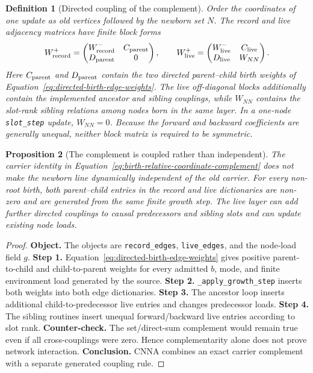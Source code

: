 \documentclass[11pt]{article}
\newtheorem{definition}{Definition}[section]
\newtheorem{proposition}[definition]{Proposition}
\theoremstyle{remark}
\newcommand{\code}[1]{\texttt{#1}}
\numberwithin{equation}{section}
\begin{document}
\begin{definition}[Directed coupling of the complement]
Order the coordinates of one update as old vertices followed by the newborn set $N$. The record and live adjacency matrices have finite block forms
\begin{equation}
  W_{\rm record}^{+}
  =
  \begin{pmatrix}
    W_{\rm record}^{-} & C_{\rm parent}\\
    D_{\rm parent} & 0
  \end{pmatrix},
  \qquad
  W_{\rm live}^{+}
  =
  \begin{pmatrix}
    W_{\rm live}^{-} & C_{\rm live}\\
    D_{\rm live} & W_{NN}
  \end{pmatrix}.
  \label{eq:complement-coupling-blocks}
\end{equation}
Here $C_{\rm parent}$ and $D_{\rm parent}$ contain the two directed parent--child birth weights of Equation~\eqref{eq:directed-birth-edge-weights}. The live off-diagonal blocks additionally contain the implemented ancestor and sibling couplings, while $W_{NN}$ contains the slot-rank sibling relations among nodes born in the same layer. In a one-node \code{slot\_step} update, $W_{NN}=0$. Because the forward and backward coefficients are generally unequal, neither block matrix is required to be symmetric.
\end{definition}

\begin{proposition}[The complement is coupled rather than independent]
The carrier identity in Equation~\eqref{eq:birth-relative-coordinate-complement} does not make the newborn line dynamically independent of the old carrier. For every non-root birth, both parent--child entries in the record and live dictionaries are non-zero and are generated from the same finite growth step. The live layer can add further directed couplings to causal predecessors and sibling slots and can update existing node loads.
\end{proposition}
\begin{proof}
\textbf{Object.} The objects are \code{record\_edges}, \code{live\_edges}, and the node-load field $g$. \textbf{Step 1.} Equation~\eqref{eq:directed-birth-edge-weights} gives positive parent-to-child and child-to-parent weights for every admitted $b$, mode, and finite environment load generated by the source. \textbf{Step 2.} \code{\_apply\_growth\_step} inserts both weights into both edge dictionaries. \textbf{Step 3.} The ancestor loop inserts additional child-to-predecessor live entries and changes predecessor loads. \textbf{Step 4.} The sibling routines insert unequal forward/backward live entries according to slot rank. \textbf{Counter-check.} The set/direct-sum complement would remain true even if all cross-couplings were zero. Hence complementarity alone does not prove network interaction. \textbf{Conclusion.} CNNA combines an exact carrier complement with a separate generated coupling rule.
\end{proof}
\end{document}
